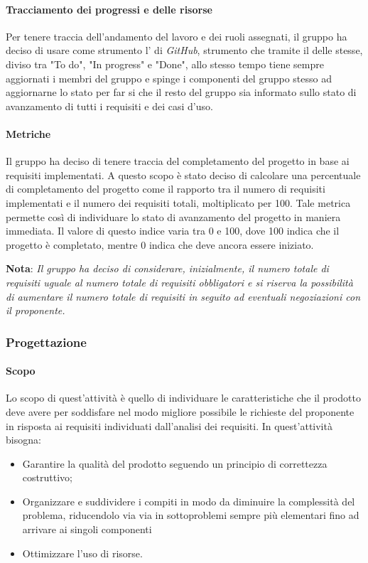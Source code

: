 \paragraph{Tracciamento dei progressi e delle risorse}
Per tenere traccia dell'andamento del lavoro e dei ruoli assegnati, il gruppo ha deciso di usare come strumento 
l' di \emph{GitHub}, strumento che tramite il  delle 
 stesse, diviso tra "To do", "In progress" e "Done", allo stesso tempo tiene sempre aggiornati i 
membri del gruppo e spinge i componenti del gruppo stesso ad aggiornarne lo stato per far si che il resto del gruppo 
sia informato sullo stato di avanzamento di tutti i requisiti e dei casi d'uso.

\paragraph{Metriche}

Il gruppo ha deciso di tenere traccia del completamento del progetto in base ai requisiti implementati. A questo scopo è 
stato deciso di calcolare una percentuale di completamento del progetto come il rapporto tra il numero di requisiti 
implementati e il numero dei requisiti totali, moltiplicato per 100. Tale metrica permette così di individuare lo stato 
di avanzamento del progetto in maniera immediata. Il valore di questo indice varia tra 0 e 100, dove 100 indica che il 
progetto è completato, mentre 0 indica che deve ancora essere iniziato.
\begin{center}
    \textbf{Nota}: \emph{Il gruppo ha deciso di considerare, inizialmente, il numero totale di requisiti uguale al numero totale di requisiti obbligatori e si riserva la 
    possibilità di aumentare il numero totale di requisiti in seguito ad eventuali negoziazioni con il proponente.}
\end{center}
 
\subsubsection{Progettazione}
 
\paragraph{Scopo}

Lo scopo di quest'attività è quello di individuare le caratteristiche che il prodotto deve avere per soddisfare nel 
modo migliore possibile le richieste del proponente in risposta ai requisiti individuati dall'analisi dei requisiti. 
In quest'attività bisogna:
\begin{itemize}
    \item Garantire la qualità del prodotto seguendo un principio di correttezza costruttivo;
    \item Organizzare e suddividere i compiti in modo da diminuire la complessità del problema, riducendolo via via in 
    sottoproblemi sempre più elementari fino ad arrivare ai singoli componenti
    \item Ottimizzare l'uso di risorse.
\end{itemize}

